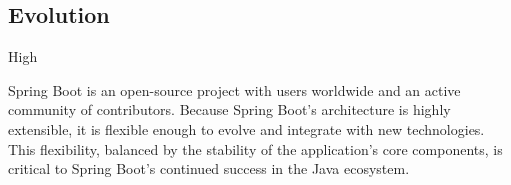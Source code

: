 \subsection*{Evolution}

\ranking High

Spring Boot is an open-source project with users worldwide and an active community of contributors. Because Spring Boot's architecture is highly extensible, it is flexible enough to evolve and integrate with new technologies. This flexibility, balanced by the stability of the application's core components, is critical to Spring Boot's continued success in the Java ecosystem.